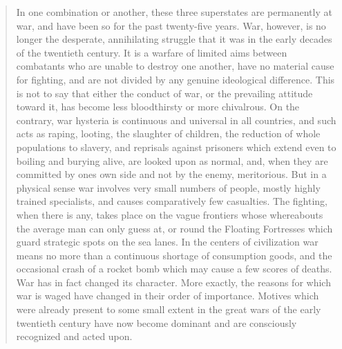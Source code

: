 \begin{quotation}
In one combination or another, these three superstates are permanently
at war, and have been so for the past twenty-five years. War, however,
is no longer the desperate, annihilating struggle that it was in the
early decades of the twentieth century. It is a warfare of limited aims
between combatants who are unable to destroy one another, have no
material cause for fighting, and are not divided by any genuine
ideological difference. This is not to say that either the conduct of
war, or the prevailing attitude toward it, has become less bloodthirsty
or more chivalrous. On the contrary, war hysteria is continuous and
universal in all countries, and such acts as raping, looting, the
slaughter of children, the reduction of whole populations to slavery,
and reprisals against prisoners which extend even to boiling and burying
alive, are looked upon as normal, and, when they are committed by
one\textquotesingle s own side and not by the enemy, meritorious. But in
a physical sense war involves very small numbers of people, mostly
highly trained specialists, and causes comparatively few casualties. The
fighting, when there is any, takes place on the vague frontiers whose
whereabouts the average man can only guess at, or round the Floating
Fortresses which guard strategic spots on the sea lanes. In the centers
of civilization war means no more than a continuous shortage of
consumption goods, and the occasional crash of a rocket bomb which may
cause a few scores of deaths. War has in fact changed its character.
More exactly, the reasons for which war is waged have changed in their
order of importance. Motives which were already present to some small
extent in the great wars of the early twentieth century have now become
dominant and are consciously recognized and acted upon.
\end{quotation}

